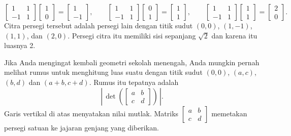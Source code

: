 \begin{equation*}
\begin{bmatrix}
1 & 1 \\
-1 & 1
\end{bmatrix}
\begin{bmatrix}
1 \\ 0
\end{bmatrix} =
\begin{bmatrix}
1 \\
-1
\end{bmatrix}
,
\qquad
\begin{bmatrix}
1 & 1 \\
-1 & 1
\end{bmatrix}
\begin{bmatrix}
0 \\ 1
\end{bmatrix} =
\begin{bmatrix}
1 \\
1
\end{bmatrix}
,
\qquad
\begin{bmatrix}
1 & 1 \\
-1 & 1
\end{bmatrix}
\begin{bmatrix}
1 \\ 1
\end{bmatrix} =
\begin{bmatrix}
2 \\
0
\end{bmatrix}
.
\end{equation*}
Citra persegi tersebut adalah persegi lain dengan titik sudut $(0,0)$, $(1,-1)$,
$(1,1)$, dan $(2,0)$.  Persegi citra itu
memiliki
sisi sepanjang $\sqrt{2}$ dan karena itu luasnya 2.

Jika Anda mengingat kembali geometri sekolah menengah, Anda mungkin pernah melihat rumus untuk
menghitung luas suatu 
dengan titik sudut $(0,0)$, $(a,c)$, $(b,d)$
dan $(a+b,c+d)$.  Rumus itu tepatnya adalah
\begin{equation*}
\left\lvert \, \det \left(
\begin{bmatrix} a & b \\ c & d \end{bmatrix}
\right) \, \right\lvert.
\end{equation*}
Garis vertikal di atas menyatakan nilai mutlak.
Matriks $\left[ \begin{smallmatrix} a & b \\ c & d \end{smallmatrix}
\right]$
memetakan persegi satuan ke jajaran genjang yang diberikan.

